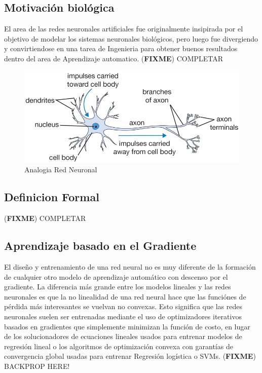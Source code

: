 \documentclass[a4paper,11pt,spanish]{book}
\newcommand*{\FIXME}[1]{{(\textbf{FIXME}) {#1}}}
\begin{document}
      \subsection {Motivación biológica}
	El area de las redes neuronales artificiales fue originalmente insipirada por el objetivo de modelar los sistemas neuronales biológicos,
	pero luego fue divergiendo y convirtiendose en una tarea de Ingenieria para obtener buenos resultados dentro del area de Aprendizaje automatico.
	\FIXME{COMPLETAR}
	\begin{figure}[h]
	  \includegraphics[scale=0.5]{./img/analogy_neural_net.png}
	  \caption{Analogia Red Neuronal}
	  \label{fig:analogy_neural_net}
	\end{figure}


      \subsection{Definicion Formal}
	\FIXME{COMPLETAR}

      \subsection{Aprendizaje basado en el Gradiente}
	El diseño y entrenamiento de una red neural no es muy diferente de la formación de cualquier otro modelo de aprendizaje automático con descenso por el gradiente.
	La diferencia más grande entre los modelos lineales y las redes neuronales es que la no linealidad de una red neural hace que las funciónes de pérdida
	más interesantes se vuelvan no convexas. Esto significa que las redes neuronales suelen ser entrenadas mediante el uso de optimizadores iterativos basados ​​en gradientes
	que simplemente minimizan la función de costo, en lugar de los solucionadores de ecuaciones lineales usados ​​para entrenar modelos de regresión lineal o los algoritmos de optimización
	convexa con garantías de convergencia global usadas para entrenar Regresión logística o SVMs.
\FIXME{BACKPROP HERE!}
\end{document}
